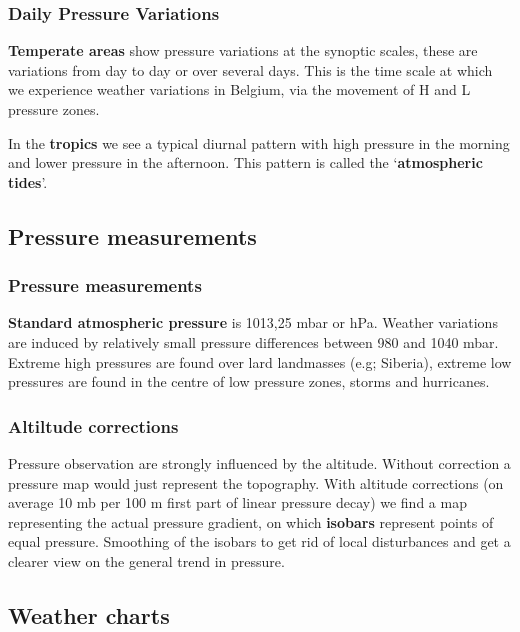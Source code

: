 \documentclass[oneside]{book}
\begin{document}
\subsubsection{Daily Pressure
Variations}\label{daily-pressure-variations}

\textbf{Temperate areas} show pressure variations at the synoptic
scales, these are variations from day to day or over several days. This
is the time scale at which we experience weather variations in Belgium,
via the movement of H and L pressure zones.

In the \textbf{tropics} we see a typical diurnal pattern with high
pressure in the morning and lower pressure in the afternoon. This
pattern is called the `\textbf{atmospheric tides}'.

\subsection{Pressure measurements}\label{pressure-measurements}

\subsubsection{Pressure measurements}\label{pressure-measurements-1}

\textbf{Standard atmospheric pressure} is 1013,25 mbar or hPa. Weather
variations are induced by relatively small pressure differences between
980 and 1040 mbar. Extreme high pressures are found over lard landmasses
(e.g; Siberia), extreme low pressures are found in the centre of low
pressure zones, storms and hurricanes.

\subsubsection{Altiltude corrections}\label{altiltude-corrections}

Pressure observation are strongly influenced by the altitude. Without
correction a pressure map would just represent the topography. With
altitude corrections (on average 10 mb per 100 m first part of linear
pressure decay) we find a map representing the actual pressure gradient,
on which \textbf{isobars} represent points of equal pressure. Smoothing
of the isobars to get rid of local disturbances and get a clearer view
on the general trend in pressure.

\subsection{Weather charts}\label{weather-charts}
\end{document}
